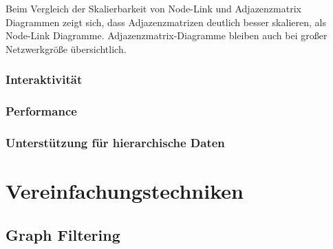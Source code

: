 Beim Vergleich der Skalierbarkeit von Node-Link und Adjazenzmatrix Diagrammen zeigt sich, dass Adjazenzmatrizen deutlich besser skalieren, als Node-Link Diagramme. Adjazenzmatrix-Diagramme bleiben auch bei großer Netzwerkgröße übersichtlich.

\subsubsection{Interaktivität}



\subsubsection{Performance}
\subsubsection{Unterstützung für hierarchische Daten}

\section{Vereinfachungstechniken}

\subsection{Graph Filtering}